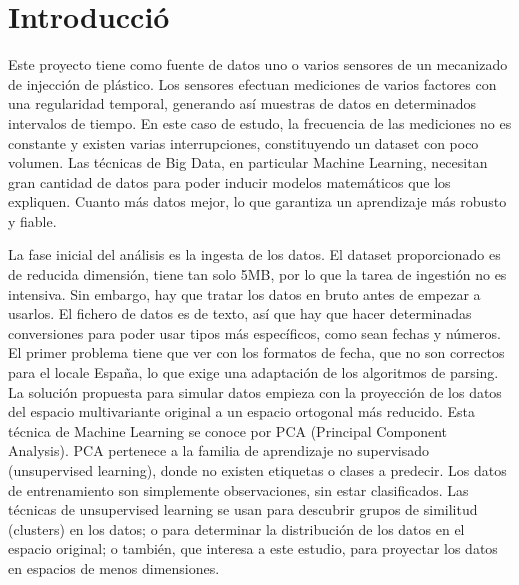 \documentclass[11pt,spanish,listoffigures,listoftables]{tfgetsinf}
\begin{document}

\mainmatter


\chapter{Introducci\'o}

Este proyecto tiene como fuente de datos uno o varios sensores de un mecanizado de injección de plástico. Los sensores efectuan mediciones de varios factores con una regularidad temporal, generando así muestras de datos en determinados intervalos de tiempo. En este caso de estudo, la frecuencia de las mediciones no es constante y existen varias interrupciones, constituyendo un dataset con poco volumen. Las técnicas de Big Data, en particular Machine Learning, necesitan gran cantidad de datos para poder inducir modelos matemáticos que los expliquen. Cuanto más datos mejor, lo que garantiza un aprendizaje más robusto y fiable.

La fase inicial del análisis es la ingesta de los datos. El dataset proporcionado es de reducida dimensión, tiene tan solo 5MB, por lo que la tarea de ingestión no es intensiva. Sin embargo, hay que tratar los datos en bruto antes de empezar a usarlos. El fichero de datos es de texto, así que hay que hacer determinadas conversiones para poder usar tipos más específicos, como sean fechas y números. El primer problema tiene que ver con los formatos de fecha, que no son correctos para el locale España, lo que exige una adaptación de los algoritmos de parsing.
La solución propuesta para simular datos empieza con la proyección de los datos del espacio multivariante original a un espacio ortogonal más reducido. Esta técnica de Machine Learning se conoce por PCA (Principal Component Analysis). PCA pertenece a la familia de aprendizaje no supervisado (unsupervised learning), donde no existen etiquetas o clases a predecir. Los datos de entrenamiento son simplemente observaciones, sin estar clasificados. Las técnicas de unsupervised learning se usan para descubrir grupos de similitud (clusters) en los datos; o para determinar la distribución de los datos en el espacio original; o también, que interesa a este estudio, para proyectar los datos en espacios de menos dimensiones.
\end{document}
